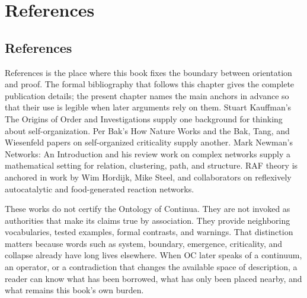\documentclass[11pt,a4paper,openany]{book}
\begin{document}
\section{References}
\subsection{References}
References is the place where this book fixes the boundary between orientation and proof. The formal bibliography that follows this chapter gives the complete publication details; the present chapter names the main anchors in advance so that their use is legible when later arguments rely on them. Stuart Kauffman's The Origins of Order and Investigations supply one background for thinking about self-organization. Per Bak's How Nature Works and the Bak, Tang, and Wiesenfeld papers on self-organized criticality supply another. Mark Newman's Networks: An Introduction and his review work on complex networks supply a mathematical setting for relation, clustering, path, and structure. RAF theory is anchored in work by Wim Hordijk, Mike Steel, and collaborators on reflexively autocatalytic and food-generated reaction networks. \cite{kauffman_autocatalytic,raf_networks}\par
These works do not certify the Ontology of Continua. They are not invoked as authorities that make its claims true by association. They provide neighboring vocabularies, tested examples, formal contrasts, and warnings. That distinction matters because words such as system, boundary, emergence, criticality, and collapse already have long lives elsewhere. When OC later speaks of a continuum, an operator, or a contradiction that changes the available space of description, a reader can know what has been borrowed, what has only been placed nearby, and what remains this book's own burden.\par
\end{document}

